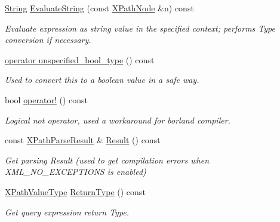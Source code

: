 \begin{DoxyCompactItemize}
\hyperlink{namespaceMezzanine_1_1xml_a3ddf35656ecc38b6fa1d0364d9ad3b2c}{String} \hyperlink{classMezzanine_1_1xml_1_1XPathQuery_a373271959b00d96b08a846b2e56607c3}{EvaluateString} (const \hyperlink{classMezzanine_1_1xml_1_1XPathNode}{XPathNode} \&n) const 
\begin{DoxyCompactList}\small\item\em Evaluate expression as string value in the specified context; performs Type conversion if necessary. \item\end{DoxyCompactList}\item 
\hyperlink{classMezzanine_1_1xml_1_1XPathQuery_aafde02d273f66f6b2215517b8f4d83d9}{operator unspecified\_\-bool\_\-type} () const 
\begin{DoxyCompactList}\small\item\em Used to convert this to a boolean value in a safe way. \item\end{DoxyCompactList}\item 
bool \hyperlink{classMezzanine_1_1xml_1_1XPathQuery_abc288442d293f02b710038e8772e3c4a}{operator!} () const 
\begin{DoxyCompactList}\small\item\em Logical not operator, used a workaround for borland compiler. \item\end{DoxyCompactList}\item 
\hypertarget{classMezzanine_1_1xml_1_1XPathQuery_a305514c768db9e05813f600d53c3ea0a}{
const \hyperlink{structMezzanine_1_1xml_1_1XPathParseResult}{XPathParseResult} \& \hyperlink{classMezzanine_1_1xml_1_1XPathQuery_a305514c768db9e05813f600d53c3ea0a}{Result} () const }
\label{classMezzanine_1_1xml_1_1XPathQuery_a305514c768db9e05813f600d53c3ea0a}

\begin{DoxyCompactList}\small\item\em Get parsing Result (used to get compilation errors when XML\_\-NO\_\-EXCEPTIONS is enabled) \item\end{DoxyCompactList}\item 
\hyperlink{namespaceMezzanine_1_1xml_aca3f7ad3597c316e5ee6c216e126e7b0}{XPathValueType} \hyperlink{classMezzanine_1_1xml_1_1XPathQuery_ab48ebdf3fb2fd1487d5fc8778b1407e2}{ReturnType} () const 
\begin{DoxyCompactList}\small\item\em Get query expression return Type. \item\end{DoxyCompactList}\end{DoxyCompactItemize}


